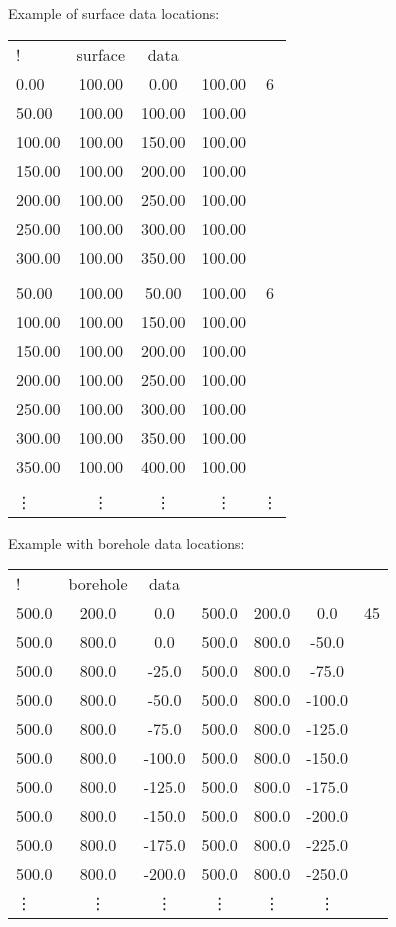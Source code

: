 Example of surface data locations:
\begin{fileExample}
\begin{tabular}{|lcccc|}
\hline
! & surface & data & & \\
0.00 & 100.00 & 0.00 & 100.00 &	6\\
50.00	&  100.00 & 100.00	& 100.00	&	\\
100.00	&	100.00	&	150.00	& 100.00 & \\
150.00	&	100.00	&	200.00	&	100.00	&	\\
200.00	&	100.00	&	250.00	&	100.00	&	\\
250.00	&	100.00	&	300.00	&	100.00	&	\\
300.00	&	100.00	&	350.00	&	100.00	&	\\
 & & & & \\
50.00	& 100.00	&	50.00	& 100.00	& 6\\
100.00	&	100.00	&	150.00	&	100.00	&	\\
150.00	&	100.00	&	200.00	&	100.00	&	\\
200.00	&	100.00	&	250.00	&	100.00	&	\\
250.00	&	100.00	&	300.00	&	100.00	&	\\
300.00	&	100.00	&	350.00	&	100.00	&	\\
350.00	&	100.00	&	400.00	&	100.00	&	\\
 & & & & \\
\vdots & \vdots & \vdots & \vdots & \vdots \\
\hline
\end{tabular}
\end{fileExample}
%
Example with borehole data locations:
\begin{fileExample}
\begin{tabular}{|lcccccc|}
\hline
! & borehole & data &  &  &  & \\
500.0 & 200.0 &	0.0 & 500.0 & 200.0 &	0.0 &	45\\
500.0 & 800.0 &	0.0 & 500.0 & 800.0 &	-50.0 & \\
500.0 & 800.0 &	-25.0 & 500.0 & 800.0 &	-75.0 & \\
500.0 & 800.0 &	-50.0 & 500.0 & 800.0 & -100.0 & \\
500.0 & 800.0 &	-75.0 & 500.0 & 800.0 & -125.0 & \\
500.0 & 800.0 & -100.0 & 500.0 & 800.0 & -150.0 & \\
500.0 & 800.0 & -125.0 & 500.0 & 800.0 & -175.0 & \\
500.0 & 800.0 & -150.0 & 500.0 & 800.0 & -200.0 & \\
500.0 & 800.0 & -175.0 & 500.0 & 800.0 & -225.0 &	\\
500.0 & 800.0 & -200.0 & 500.0 & 800.0 & -250.0 & \\
\vdots & \vdots & \vdots & \vdots & \vdots & \vdots & \\
\hline
\end{tabular}
\end{fileExample}